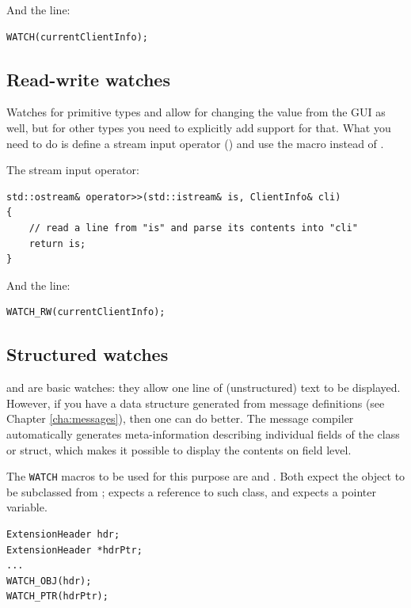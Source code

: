 And the  line:

\begin{verbatim}
WATCH(currentClientInfo);
\end{verbatim}


\subsection{Read-write watches}

Watches for primitive types and  allow for changing
the value from the GUI as well, but for other types you need to explicitly
add support for that. What you need to do is define a stream input
operator () and use the  macro instead of
.

The stream input operator:

\begin{verbatim}
std::ostream& operator>>(std::istream& is, ClientInfo& cli)
{
    // read a line from "is" and parse its contents into "cli"
    return is;
}
\end{verbatim}

And the  line:

\begin{verbatim}
WATCH_RW(currentClientInfo);
\end{verbatim}


\subsection{Structured watches}

 and  are basic watches: they allow one
line of (unstructured) text to be displayed. However, if you have a
data structure generated from message definitions (see Chapter \ref{cha:messages}),
then one can do better. The message compiler automatically generates
meta-information describing individual fields of the class or struct,
which makes it possible to display the contents on field level.

The \texttt{WATCH} macros to be used for this purpose are 
and . Both expect the object to be subclassed from
;  expects a reference to such class,
and  expects a pointer variable.

\begin{verbatim}
ExtensionHeader hdr;
ExtensionHeader *hdrPtr;
...
WATCH_OBJ(hdr);
WATCH_PTR(hdrPtr);
\end{verbatim}

